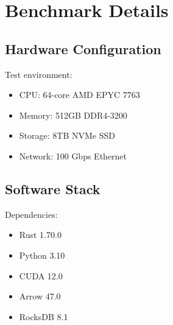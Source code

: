 \documentclass[10pt]{article}
\begin{document}
\section{Benchmark Details}

\subsection{Hardware Configuration}

Test environment:

\begin{itemize}
    \item CPU: 64-core AMD EPYC 7763
    \item Memory: 512GB DDR4-3200
    \item Storage: 8TB NVMe SSD
    \item Network: 100 Gbps Ethernet
\end{itemize}

\subsection{Software Stack}

Dependencies:

\begin{itemize}
    \item Rust 1.70.0
    \item Python 3.10
    \item CUDA 12.0
    \item Arrow 47.0
    \item RocksDB 8.1
\end{itemize}
\end{document}
